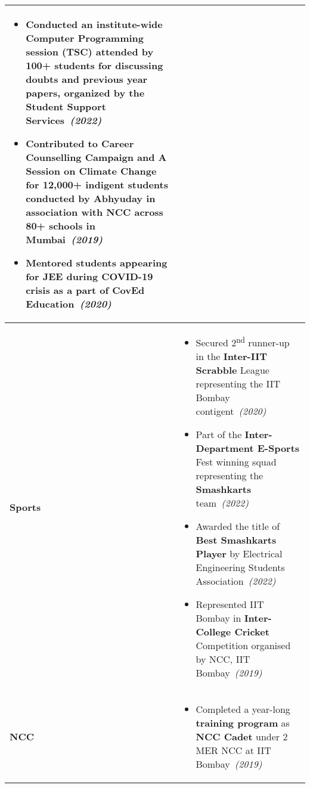 \documentclass[10pt,a4paper,sans]{moderncv}        %
\newcommand{\rhsmall}[1]{\hfill{\footnotesize{\textsl{(#1)}}}}
\begin{document}
\begin{tabular}{p{0.99in}p{6.01in}}
\begin{itemize}
	\item Conducted an institute-wide \textbf{Computer Programming} session (TSC) attended by {100+ students} for discussing doubts and previous year papers, organized by the Student Support Services\ \rhsmall{2022}%
	\item Contributed to Career Counselling Campaign and A Session on Climate Change for \textbf{12,000+} indigent students conducted by \textbf{Abhyuday} in association with \textbf{NCC} across \textbf{80+} schools in Mumbai\ \rhsmall{2019}%
	\item \textbf{Mentored} students appearing for JEE during \textbf{COVID-19} crisis as a part of \textbf{CovEd Education}\ \rhsmall{2020}%
\end{itemize}\\[-1em]\hline
\vspace{-0.5em}
\small\textbf{Sports}	& \vspace{-0.5em}
\begin{itemize}
	\item Secured 2\textsuperscript{nd} runner-up in the \textbf{Inter-IIT Scrabble} League representing the IIT Bombay contigent\ \rhsmall{2020}%
	\item Part of the \textbf{Inter-Department E-Sports} Fest winning squad representing the \textbf{Smashkarts} team\ \rhsmall{2022}
	\item Awarded the title of \textbf{Best Smashkarts Player} by Electrical Engineering Students Association\  \rhsmall{2022}
	\item Represented IIT Bombay in \textbf{Inter-College Cricket} Competition organised by NCC, IIT Bombay\ \rhsmall{2019}
\end{itemize}\\[-1em]\hline
\vspace{-0.5em}
\small\textbf{NCC}	& \vspace{-0.5em}
\begin{itemize}
	\item Completed a year-long \textbf{training program} as \textbf{NCC Cadet} under 2 MER NCC at IIT Bombay\ \rhsmall{2019}%

\end{itemize}
\end{tabular}
\end{document}
